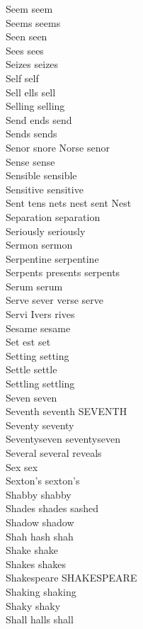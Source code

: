 Seem seem\\
Seems seems\\
Seen seen\\
Sees sees\\
Seizes seizes\\
Self self\\
Sell ells sell\\
Selling selling\\
Send ends send\\
Sends sends\\
Senor snore Norse senor\\
Sense sense\\
Sensible sensible\\
Sensitive sensitive\\
Sent tens nets nest sent Nest\\
Separation separation\\
Seriously seriously\\
Sermon sermon\\
Serpentine serpentine\\
Serpents presents serpents\\
Serum serum\\
Serve sever verse serve\\
Servi Ivers rives\\
Sesame sesame\\
Set est set\\
Setting setting\\
Settle settle\\
Settling settling\\
Seven seven\\
Seventh seventh SEVENTH\\
Seventy seventy\\
Seventyseven seventyseven\\
Several several reveals\\
Sex sex\\
Sexton's sexton's\\
Shabby shabby\\
Shades shades sashed\\
Shadow shadow\\
Shah hash shah\\
Shake shake\\
Shakes shakes\\
Shakespeare SHAKESPEARE\\
Shaking shaking\\
Shaky shaky\\
Shall halls shall\\
